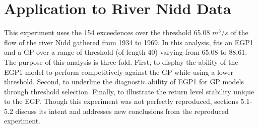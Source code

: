 \documentclass[12pt]{article}
\theoremstyle{definition}
\theoremstyle{definition}
\begin{document}
\section{Application to River Nidd Data}
This experiment uses the 154 exceedences over the threshold 65.08 $m^3/s$ of the flow of the river Nidd gathered from 1934 to 1969. In this analysis, \cite{papatawn} fits an EGP1 and a GP over a range of threshold (of length 40) varying from 65.08 to 88.61. The purpose of this analysis is three fold. First, to display the ability of the EGP1 model to perform competitively against the GP while using a lower threshold. Second, to underline the diagnostic ability of EGP1 for GP models through threshold selection. Finally, to illustrate the return level stability unique to the EGP. Though this experiment was not perfectly reproduced, sections 5.1-5.2 discuss its intent and addresses new conclusions from the reproduced experiment. 
\end{document}
